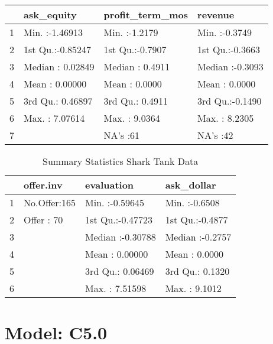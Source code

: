 \documentclass[11pt]{article}\usepackage[]{graphicx}\usepackage[]{color}
\begin{document}
\begin{table}[ht]
\centering
\begin{tabular}{rlll}
  \hline
 &   ask\_equity & profit\_term\_mos &    revenue \\ 
  \hline
1 & Min.   :-1.46913   & Min.   :-1.2179   & Min.   :-0.3749   \\ 
  2 & 1st Qu.:-0.85247   & 1st Qu.:-0.7907   & 1st Qu.:-0.3663   \\ 
  3 & Median : 0.02849   & Median : 0.4911   & Median :-0.3093   \\ 
  4 & Mean   : 0.00000   & Mean   : 0.0000   & Mean   : 0.0000   \\ 
  5 & 3rd Qu.: 0.46897   & 3rd Qu.: 0.4911   & 3rd Qu.:-0.1490   \\ 
  6 & Max.   : 7.07614   & Max.   : 9.0364   & Max.   : 8.2305   \\ 
  7 &  & NA's   :61   & NA's   :42   \\ 
   \hline
\end{tabular}
\end{table}
\begin{table}[ht]
\centering
\begin{tabular}{rlll}
  \hline
 &    offer.inv &   evaluation &   ask\_dollar \\ 
  \hline
1 & No.Offer:165   & Min.   :-0.59645   & Min.   :-0.6508   \\ 
  2 & Offer   : 70   & 1st Qu.:-0.47723   & 1st Qu.:-0.4877   \\ 
  3 &  & Median :-0.30788   & Median :-0.2757   \\ 
  4 &  & Mean   : 0.00000   & Mean   : 0.0000   \\ 
  5 &  & 3rd Qu.: 0.06469   & 3rd Qu.: 0.1320   \\ 
  6 &  & Max.   : 7.51598   & Max.   : 9.1012   \\ 
   \hline
\end{tabular}
\caption{Summary Statistics Shark Tank Data} 
\end{table}


\section{Model: C5.0}
\end{document}
